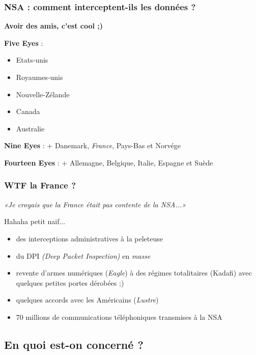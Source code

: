 \begin{frame}\frametitle{NSA : comment interceptent-ils les données ?}
    {\center \huge \bfseries Avoir des amis, c'est cool ;)}

    \vspace{1em}
    \textbf{Five Eyes} :
    \begin{itemize}
        \item Etats-unis
        \item Royaumes-unis
        \item Nouvelle-Zélande
        \item Canada
        \item Australie
    \end{itemize}
    \textbf{Nine Eyes} : + Danemark, \emph{France}, Pays-Bas et Norvége

    \textbf{Fourteen Eyes} : + Allemagne, Belgique, Italie, Espagne et Suède
\end{frame}


\begin{frame}\frametitle{WTF la France ?}
    \emph{«Je croyais que la France était pas contente de la NSA...»}
    
    Hahaha petit naif...

    \vspace{1em}
    \begin{itemize}
        \item des interceptions administratives à la peleteuse
        \item du DPI \emph{(Deep Packet Inspection)} en \emph{masse}
        \item revente d'armes numériques (\emph{Eagle}) à des régimes totalitaires
            (Kadafi) avec quelques petites portes dérobées ;)
        \item quelques accords avec les Américains (\emph{Lustre})
        \item 70 millions de communications téléphoniques transmises à la NSA
    \end{itemize}
\end{frame}


\subsection{En quoi est-on concerné ?}
